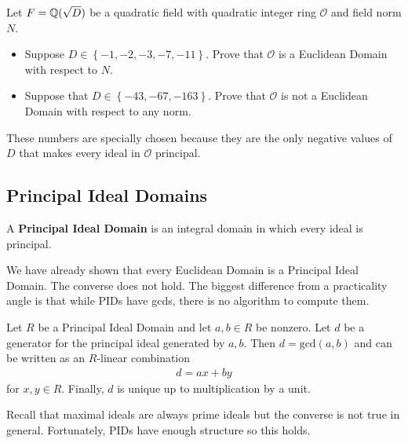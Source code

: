 \documentclass{memoir}
\begin{document}
\begin{hw}
	Let \(F = \mathbb{Q}(\sqrt{D} )\) be a quadratic field with quadratic integer ring \(\mathcal{O}\) and field norm \(N\).
	\begin{itemize}
		\item Suppose \(D \in \left\{ -1,-2,-3,-7,-11 \right\} \). Prove that \(\mathcal{O}\) is a Euclidean Domain with respect to \(N\). %
		\item Suppose that \(D \in \left\{ -43,-67,-163 \right\} \). Prove that \(\mathcal{O}\) is not a Euclidean Domain with respect to any norm. %
	\end{itemize}
	These numbers are specially chosen because they are the only negative values of \(D\) that makes every ideal in \(\mathcal{O}\) principal.
\end{hw}

\subsection{Principal Ideal Domains}
\label{sub:principal_ideal_domains}

\begin{defn}
	A \textbf{Principal Ideal Domain} is an integral domain in which every ideal is principal.
\end{defn}
We have already shown that every Euclidean Domain is a Principal Ideal Domain. The converse does not hold. The biggest difference from a practicality angle is that while PIDs have gcds, there is no algorithm to compute them.

\begin{prop}
	Let \(R\) be a Principal Ideal Domain and let \(a,b \in R\) be nonzero. Let \(d\) be a generator for the principal ideal generated by \(a,b\). Then \(d = \textrm{gcd}(a,b)\) and can be written as an \(R\)-linear combination
	\begin{align*}
		d = ax+by
	\end{align*}
	for \(x,y \in R\). Finally, \(d\) is unique up to multiplication by a unit.
\end{prop}
Recall that maximal ideals are always prime ideals but the converse is not true in general. Fortunately, PIDs have enough structure so this holds.
\end{document}
